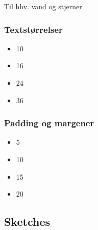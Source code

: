 Til hhv. vand og stjerner

\subsubsection*{Textstørrelser}

\begin{itemize}
    \item 10
    \item 16
    \item 24
    \item 36
\end{itemize}

\subsubsection*{Padding og margener}

\begin{itemize}
    \item 5
    \item 10
    \item 15
    \item 20
\end{itemize}

\subsection{Sketches}

